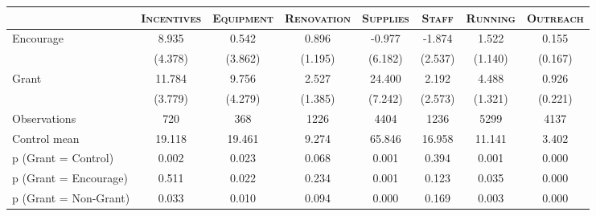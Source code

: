 \begin{tabular*}{\hsize}{@{\hskip\tabcolsep\extracolsep\fill}l*{7}{c}}
\toprule
                    &\multicolumn{1}{c}{\textsc{Incentives}}&\multicolumn{1}{c}{\textsc{Equipment}}&\multicolumn{1}{c}{\textsc{Renovation}}&\multicolumn{1}{c}{\textsc{Supplies}}&\multicolumn{1}{c}{\textsc{Staff}}&\multicolumn{1}{c}{\textsc{Running}}&\multicolumn{1}{c}{\textsc{Outreach}}\\
\midrule
Encourage           &       8.935&       0.542&       0.896&      -0.977&      -1.874&       1.522&       0.155\\
                    &     (4.378)&     (3.862)&     (1.195)&     (6.182)&     (2.537)&     (1.140)&     (0.167)\\
\addlinespace
Grant               &      11.784&       9.756&       2.527&      24.400&       2.192&       4.488&       0.926\\
                    &     (3.779)&     (4.279)&     (1.385)&     (7.242)&     (2.573)&     (1.321)&     (0.221)\\
\midrule
Observations        &         720&         368&        1226&        4404&        1236&        5299&        4137\\
Control mean        &      19.118&      19.461&       9.274&      65.846&      16.958&      11.141&       3.402\\
p (Grant = Control) &       0.002&       0.023&       0.068&       0.001&       0.394&       0.001&       0.000\\
p (Grant = Encourage)&       0.511&       0.022&       0.234&       0.001&       0.123&       0.035&       0.000\\
p (Grant = Non-Grant)&       0.033&       0.010&       0.094&       0.000&       0.169&       0.003&       0.000\\
\bottomrule
\end{tabular*}
